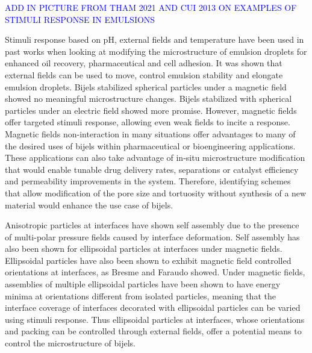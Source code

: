 \textcolor{blue}{ADD IN PICTURE FROM THAM 2021 AND CUI 2013 ON EXAMPLES OF STIMULI RESPONSE IN EMULSIONS}

Stimuli response based on pH, external fields and temperature have been used in past works when looking at modifying the microstructure of 
emulsion droplets for enhanced oil recovery, pharmaceutical and cell adhesion. \cite{haase_nanoparticle_2011, tham_magnetophoresis_2021, 
cui_stabilizing_2013, manfredini_limonene--water_2021}  It was shown that external fields can be used to move, control emulsion stability 
and elongate emulsion droplets. \cite{tham_magnetophoresis_2021, cui_stabilizing_2013, melle_pickering_2005} Bijels stabilized spherical 
particles under a magnetic field showed no meaningful microstructure changes. \cite{kim_bijels_2010} Bijels stabilized with spherical 
particles under an electric field showed more promise. \cite{carmack_tuning_2018} However, magnetic fields offer targeted stimuli 
response, allowing even weak fields to incite a response. Magnetic fields non-interaction in many situations offer advantages to many of 
the desired uses of bijels within pharmaceutical or bioengineering applications. \cite{vanoli_bijels_2022, thorson_bijel-templated_2019, thorson_composite_2018} 
These applications can also take advantage of in-situ microstructure modification that would enable tunable drug delivery rates, separations or
catalyst efficiency and permeability improvements in the system. Therefore, identifying schemes that allow modification of the pore size 
and tortuosity without synthesis of a new material would enhance the use case of bijels. 

Anisotropic particles at interfaces have shown self assembly due to the presence of multi-polar pressure fields caused by interface deformation. 
Self assembly has also been shown for ellipsoidal particles at interfaces under magnetic fields. Ellipsoidal particles have also been shown to 
exhibit magnetic field controlled orientations at interfaces, as Bresme and Faraudo showed. \cite{bresme_orientational_2007, davies_interface_2014}
Under magnetic fields, assemblies of multiple ellipsoidal particles have been shown to have energy minima at orientations different from isolated particles,
meaning that the interface coverage of interfaces decorated with ellipsoidal particles can be varied using stimuli response. 
\cite{newton_influence_2014, newton_capillary_2018} Thus ellipsoidal particles at interfaces, whose orientations and packing can be 
controlled through external fields, offer a potential means to control the microstructure of bijels.

